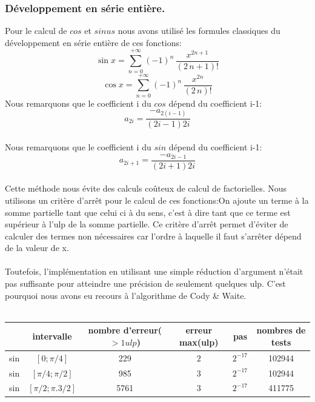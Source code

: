 \documentclass[a4,12pt]{article}
\begin{document}
\subsubsection{Développement en série entière.}
Pour le calcul de $cos$ et $sinus$ nous avons utilisé les formules classiques du développement en série entière de ces fonctions:
\begin{equation}
\sin x=\sum_{n=0}^{+{\infty}}(-1)^n\,{\frac{x^{2n+1}}{(2\,n+1)!}}
\end{equation}
\begin{equation}
 \cos x=\sum_{n=0}^{+{\infty}}(-1)^n\,{\frac{x^{2n}}{(2\,n)!}}
\end{equation}
Nous remarquons que le coefficient i du $cos$ dépend du coefficient i-1:\\
$$a_{2i} =\frac{-a_{2(i-1)}}{(2i-1)2i}$$\\
Nous remarquons que le coefficient i du $sin$ dépend du coefficient i-1:\\
$$a_{2i+1} =\frac{-a_{2i-1}}{(2i+1)2i}$$\\
Cette méthode nous évite des calculs coûteux de calcul de factorielles.
Nous utilisons un critère d'arrêt pour le calcul de ces fonctions:On ajoute un terme à la somme partielle tant que celui ci à du sens, c'est à dire tant que ce terme est supérieur à l'ulp de la somme partielle.
Ce critère d'arrêt permet d'éviter de calculer des termes non nécessaires car l'ordre à laquelle il faut s'arrêter dépend de la valeur de x.\\
\\

Toutefois, l'implémentation en utilisant une simple réduction d'argument n'était pas suffisante pour atteindre une précision de seulement quelques ulp. C'est pourquoi nous avons eu recours à l'algorithme de Cody \& Waite.\\
\\

\hspace{-2cm}\begin{tabular}{|c|c|c|c|c|c|}

\hline 
 & intervalle & nombre d'erreur($ > 1 ulp$) & erreur max(ulp) & pas & nombres de tests \\
\hline 
sin & $[0;\pi /4]$ & 229 & $2$ & $2^{-17}$ & 102944\\
\hline
sin & $[\pi /4;\pi /2]$ & 985 & $3$ & $2^{-17}$ & 102944\\
\hline
sin & $[\pi /2;\pi .3/2]$ & 5761 & $3$ & $2^{-17}$ & 411775\\
\hline
\end{tabular}\\
\\
\end{document}
